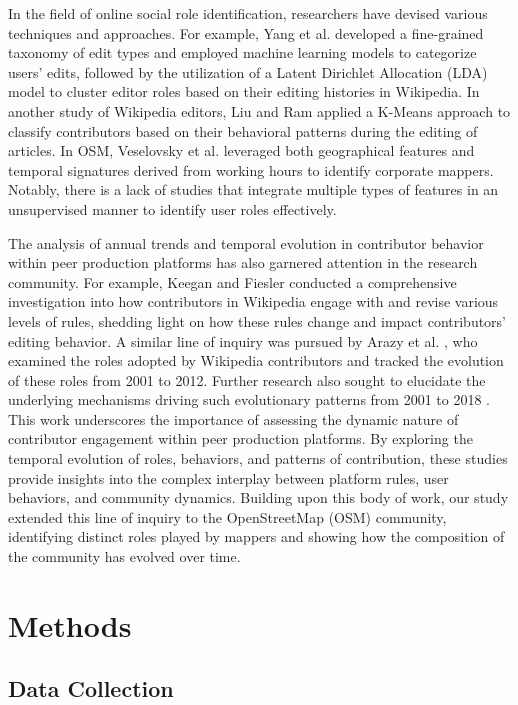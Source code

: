 \documentclass[manuscript,screen,review]{acmart}
\begin{document}
In the field of online social role identification, researchers have devised various techniques and approaches. For example, Yang et al. \cite{Yang21} developed a fine-grained taxonomy of edit types and employed machine learning models to categorize users' edits, followed by the utilization of a Latent Dirichlet Allocation (LDA) model to cluster editor roles based on their editing histories in Wikipedia. In another study of Wikipedia editors, Liu and Ram \cite{liu11} applied a K-Means approach to classify contributors based on their behavioral patterns during the editing of articles. In OSM, Veselovsky et al. \cite{Veselovsky22} leveraged both geographical features and temporal signatures derived from working hours to identify corporate mappers. Notably, there is a lack of studies that integrate multiple types of features in an unsupervised manner to identify user roles effectively.

The analysis of annual trends and temporal evolution in contributor behavior within peer production platforms has also garnered attention in the research community. For example, Keegan and Fiesler \cite{Keegan17} conducted a comprehensive investigation into how contributors in Wikipedia engage with and revise various levels of rules, shedding light on how these rules change and impact contributors' editing behavior. A similar line of inquiry was pursued by Arazy et al. \cite{Arazy15}, who examined the roles adopted by Wikipedia contributors and tracked the evolution of these roles from 2001 to 2012. Further research also sought to elucidate the underlying mechanisms driving such evolutionary patterns from 2001 to 2018 \cite{Arazy20}. This work underscores the importance of assessing the dynamic nature of contributor engagement within peer production platforms. By exploring the temporal evolution of roles, behaviors, and patterns of contribution, these studies provide insights into the complex interplay between platform rules, user behaviors, and community dynamics. Building upon this body of work, our study extended this line of inquiry to the OpenStreetMap (OSM) community, identifying distinct roles played by mappers and showing how the composition of the community has evolved over time. 


\section{Methods}

\subsection{Data Collection}
\end{document}
